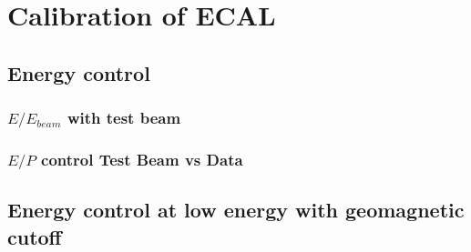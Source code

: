 \part{Calibration of ECAL}

\chapter{Energy control}
\section{$E/E_{beam}$ with test beam}
\section{$E/P$ control Test Beam vs Data}

\chapter{Energy control at low energy with geomagnetic cutoff}